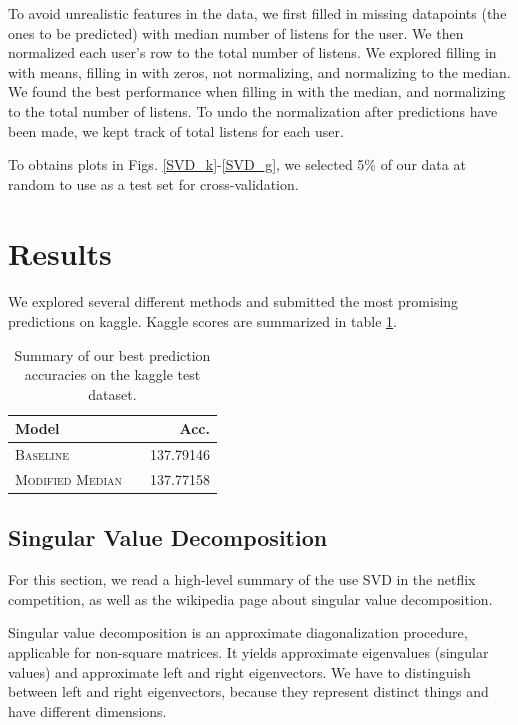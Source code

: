 \documentclass[11pt]{article}
\begin{document}
To avoid unrealistic features in the data, we first  filled in missing datapoints (the ones to be predicted) with median number of listens for the user. We then normalized each user's row to the total number of listens. We explored filling in with means, filling in with zeros, not normalizing, and normalizing to the median. We found the best performance when filling in with the median, and normalizing to the total number of listens. To undo the normalization after predictions have been made, we kept track of total listens for each user. 
 
To obtains plots in Figs. \ref{SVD_k}-\ref{SVD_g}, we selected 5\% of our data at random to use as a test set for cross-validation. 
\paragraph{} 
\section{Results}
\paragraph{} We explored several different methods and submitted the most promising predictions on kaggle. Kaggle scores are summarized in table \ref{tab:results}. 
  \begin{table}
\centering
\begin{tabular}{llr}
 \toprule
 Model &  & Acc. \\
 \midrule
 \textsc{Baseline} & &137.79146\\
 \textsc{Modified Median} && 137.77158\\
 \bottomrule
\end{tabular}
\caption{\label{tab:results} Summary of our best prediction accuracies on the kaggle test dataset.}
\end{table}


\subsection{Singular Value Decomposition}
For this section, we read a high-level summary of the use SVD in the netflix competition\cite{SVD}, as well as the wikipedia page about singular value decomposition. 

Singular value decomposition is an approximate diagonalization procedure, applicable for non-square matrices. It yields approximate eigenvalues (singular values) and approximate left and right eigenvectors. We have to distinguish between left and right eigenvectors, because they represent distinct things and have different dimensions. 
\end{document}
